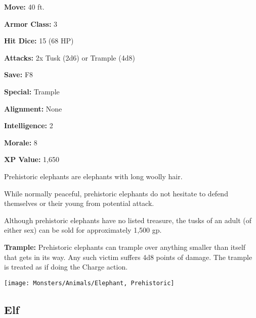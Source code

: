 \begin{multicols*}{2}
{\textbf{Move:} 40 ft.

\textbf{Armor Class:} 3

\textbf{Hit Dice:} 15 (68 HP)

\textbf{Attacks:} 2x Tusk (2d6) or Trample (4d8)

\textbf{Save:} F8

\textbf{Special:} Trample

\textbf{Alignment:} None

\textbf{Intelligence:} 2

\textbf{Morale:} 8

\textbf{XP Value:} 1,650}

Prehistoric elephants are elephants with long woolly hair.

While normally peaceful, prehistoric elephants do not hesitate to defend themselves or their young from potential attack.

Although prehistoric elephants have no listed treasure, the tusks of an adult (of either sex) can be sold for approximately 1,500 gp.

\textbf{Trample:} Prehistoric elephants can trample over anything smaller than itself that gets in its way. Any such victim suffers 4d8 points of damage. The trample is treated as if doing the Charge action.

\texttt{[image: Monsters/Animals/Elephant, Prehistoric]}

\subsection{Elf}
\end{multicols*}

